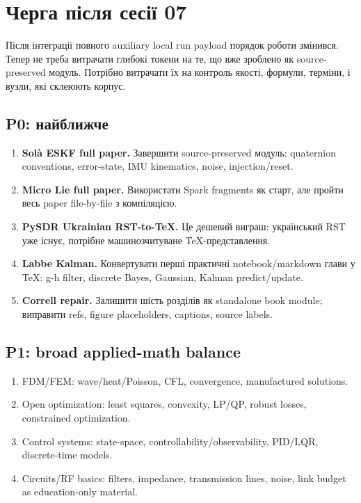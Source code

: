 \chapter{Черга після сесії 07}
\label{chap:session07-queue}

Після інтеграції повного auxiliary local run payload порядок роботи змінився. Тепер не треба витрачати глибокі токени на те, що вже зроблено як source-preserved модуль. Потрібно витрачати їх на контроль якості, формули, терміни, і вузли, які склеюють корпус.

\section{P0: найближче}

\begin{enumerate}[leftmargin=*]
\item \textbf{Solà ESKF full paper.} Завершити source-preserved модуль: quaternion conventions, error-state, IMU kinematics, noise, injection/reset.
\item \textbf{Micro Lie full paper.} Використати Spark fragments як старт, але пройти весь paper file-by-file з компіляцією.
\item \textbf{PySDR Ukrainian RST-to-TeX.} Це дешевий виграш: український RST уже існує, потрібне машинозчитуване TeX-представлення.
\item \textbf{Labbe Kalman.} Конвертувати перші практичні notebook/markdown глави у TeX: g-h filter, discrete Bayes, Gaussian, Kalman predict/update.
\item \textbf{Correll repair.} Залишити шість розділів як standalone book module; виправити refs, figure placeholders, captions, source labels.
\end{enumerate}

\section{P1: broad applied-math balance}

\begin{enumerate}[leftmargin=*]
\item FDM/FEM: wave/heat/Poisson, CFL, convergence, manufactured solutions.
\item Open optimization: least squares, convexity, LP/QP, robust losses, constrained optimization.
\item Control systems: state-space, controllability/observability, PID/LQR, discrete-time models.
\item Circuits/RF basics: filters, impedance, transmission lines, noise, link budget as education-only material.
\end{enumerate}

